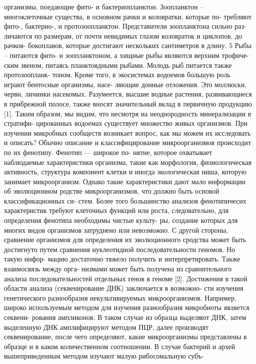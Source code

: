 организмы, поедающие фито- и бактериопланктон.
Зоопланктон – многоклеточные существа, в основном рачки и коловратки, которые по-
требляют фито-, бактерио-, и протозоопланктон. Представители зоопланктона сильно раз-
личаются по размерам, от почти невидимых глазом коловраток и циклопов, до рачков-
бокоплавов, которые достигают нескольких сантиметров в длину.
5
Рыбы – питаются фито- и зоопланктоном, а хищные рыбы являются верхним трофиче-
ским звеном, питаясь планктоядными рыбами. Молодь рыб питается также протозоопланк-
тоном.
Кроме того, в экосистемах водоемов большую роль играют бентосные организмы, насе-
ляющие донные отложения. Это моллюски, черви, личинки насекомых. Разумеется, высшие
водные растения, развивающиеся в прибрежной полосе, также вносят значительный вклад
в первичную продукцию [1].
Таким образом, мы видим, что несмотря на неоднородность минерализации в стратифи-
цированных водоемах существует множество живых организмов. При изучении микробных
сообществ возникает вопрос, как мы можем их исследовать и описать? Обычно описание и
классифицирование микроорганизмов происходит по их фенотипу. Фенотип — широкое по-
нятие, которое охватывает наблюдаемые характеристики организма, такие как морфология,
физиологическая активность, структура компонент клетки и иногда экологическая ниша,
которую занимает микроорганизм. Однако такие характеристики дают мало информации об
эволюционном родстве микроорганизмов, что должно быть основой классификационных си-
стем. Более того большинство анализов фенотипичесих характеристик требуют клеточных
функций или роста, следовательно, для определения фенотипа необходимы чистые культу-
ры, создание которых для многих видов организмов затруднено или невозможно. С другой
стороны, сравнение организмов для определения их эволюционного сродства может быть
достигнуто путем сравнения нуклеотидной последовательности геномов. Но такую инфор-
мацию достаточно тяжело получить и интерпретировать. Также взаимосвязь между орга-
низмами может быть получена из сравнительного анализа последовательностей отдельных
генов в геноме [2].
Достижения в такой области анализа (секвенирование ДНК) заключается в возможно-
сти изучения генетического разнообразия некультивируемых микроорганизмов. Например,
широко используемым методом для изучения разнообразия микробиоты является секвени-
рования ампликонов. В таком случае из образца выделяют ДНК, затем выделенную ДНК
амплифицируют методом ПЦР, далее производят секвенирование, после чего определяют,
какие микроорганизмы представлены в образце и в каком количественном соотношении. В
случае бактерий и архей вышеприведенным методом изучают малую рибосомальную субъ-
